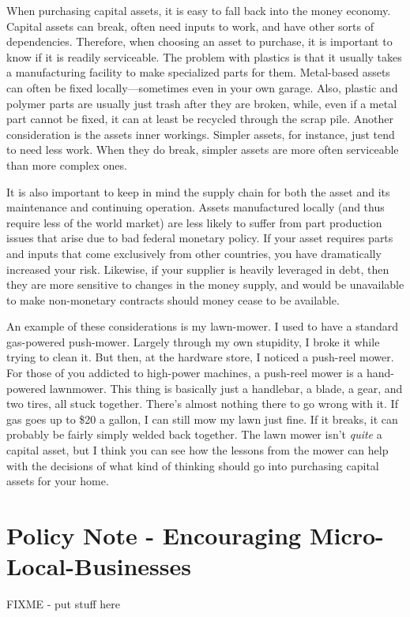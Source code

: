 \documentclass[letterpaper]{article}
\begin{document}
{\color{black}
When purchasing capital assets, it is easy to fall back into the money
economy. Capital assets can break, often need inputs to work, and have
other sorts of dependencies. Therefore, when choosing an asset to
purchase, it is important to know if it is readily serviceable. The
problem with plastics is that it usually takes a manufacturing facility
to make specialized parts for them. Metal-based assets can often be
fixed locally—sometimes even in your own garage. Also, plastic and
polymer parts are usually just trash after they are broken, while, even
if a metal part cannot be fixed, it can at least be recycled through
the scrap pile.  Another consideration is the asset{\textquotesingle}s
inner workings.  Simpler assets, for instance, just tend to need less
work.  When they do break, simpler assets are more often serviceable
than more complex ones.  }

{\color{black}
It is also important to keep in mind the supply chain for both the asset
and its maintenance and continuing operation.  Assets manufactured
locally (and thus require less of the world market) are less likely to
suffer from part production issues that arise due to bad federal
monetary policy.  If your asset requires parts and inputs that come
exclusively from other countries, you have dramatically increased your
risk.  Likewise, if your supplier is heavily leveraged in debt, then
they are more sensitive to changes in the money supply, and would be
unavailable to make non-monetary contracts should money cease to be
available.  }

{\color{black}
An example of these considerations is my lawn-mower. I used to have a
standard gas-powered push-mower. Largely through my own stupidity, I
broke it while trying to clean it. But then, at the hardware store, I
noticed a push-reel mower. For those of you addicted to high-power
machines, a push-reel mower is a hand-powered lawnmower. This thing is
basically just a handlebar, a blade, a gear, and two tires, all stuck
together. There’s almost nothing there to go wrong with it. If gas goes
up to \$20 a gallon, I can still mow my lawn just fine.  If it breaks,
it can probably be fairly simply welded back together. The lawn mower
isn’t \textit{quite} a capital asset, but I think you can see how the
lessons from the mower can help with the decisions of what kind of
thinking should go into purchasing capital assets for your home.}

\section{Policy Note - Encouraging Micro-Local-Businesses}
{\color{black}
FIXME - put stuff here}
\end{document}
